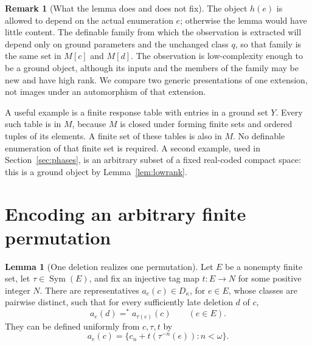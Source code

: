 \documentclass[11pt,letterpaper]{article}
\theoremstyle{definition}
\newtheorem{lemma}[definition]{Lemma}
\newtheorem{remark}[definition]{Remark}
\numberwithin{equation}{section}
\DeclareMathOperator{\Sym}{Sym}
\begin{document}
\begin{remark}[What the lemma does and does not fix]\label{rem:observation}
The object $h(e)$ is allowed to depend on the actual enumeration $e$;
otherwise the lemma would have little content. The definable family from
which the observation is extracted will depend only on ground parameters
and the unchanged class $q$, so that family is the same set in $M[c]$ and
$M[d]$. The observation is low-complexity enough to be a ground object,
although its inputs and the members of the family may be new and have high
rank. We compare two generic presentations of one extension, not images
under an automorphism of that extension.
\end{remark}

A useful example is a finite response table with entries in a ground set
$Y$. Every such table is in $M$, because $M$ is closed under forming finite
sets and ordered tuples of its elements. A finite set of these tables is
also in $M$. No definable enumeration of that finite set is required.
A second example, used in Section~\ref{sec:phases}, is an arbitrary subset
of a fixed real-coded compact space: this is a ground object by
Lemma~\ref{lem:lowrank}.

\section{Encoding an arbitrary finite permutation}\label{sec:coding}

\begin{lemma}[One deletion realizes one permutation]\label{lem:coding}
Let $E$ be a nonempty finite set, let $\tau\in\Sym(E)$, and fix an injective
tag map $t:E\to N$ for some positive integer $N$. There are representatives
$a_e(c)\in D_\kappa$, for $e\in E$, whose classes are pairwise distinct,
such that for every sufficiently late deletion $d$ of $c$,
\begin{equation}\label{eq:permutation}
 a_e(d)=^*a_{\tau(e)}(c)\qquad(e\in E).
\end{equation}
They can be defined uniformly from $c,\tau,t$ by
\begin{equation}\label{eq:coding}
 a_e(c)=\{c_n+t(\tau^{-n}(e)):n<\omega\}.
\end{equation}
\end{lemma}
\end{document}
